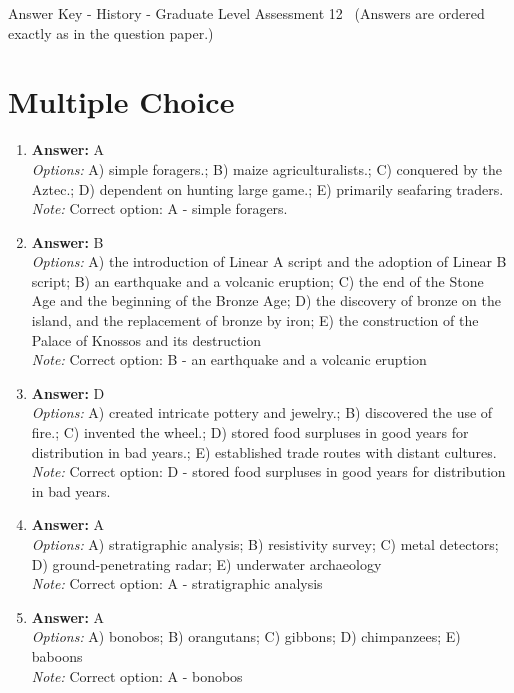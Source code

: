 \documentclass[12pt]{article}
\begin{document}
\begin{center}
Answer Key - History - Graduate Level Assessment 12 \
\small (Answers are ordered exactly as in the question paper.)
\end{center}

\section*{Multiple Choice}
\begin{enumerate}[label=\arabic*.]
\item \textbf{Answer:} A
\\ \textit{Options:} A) simple foragers.; B) maize agriculturalists.; C) conquered by the Aztec.; D) dependent on hunting large game.; E) primarily seafaring traders.
\\ \textit{Note:} Correct option: A - simple foragers.
\item \textbf{Answer:} B
\\ \textit{Options:} A) the introduction of Linear A script and the adoption of Linear B script; B) an earthquake and a volcanic eruption; C) the end of the Stone Age and the beginning of the Bronze Age; D) the discovery of bronze on the island, and the replacement of bronze by iron; E) the construction of the Palace of Knossos and its destruction
\\ \textit{Note:} Correct option: B - an earthquake and a volcanic eruption
\item \textbf{Answer:} D
\\ \textit{Options:} A) created intricate pottery and jewelry.; B) discovered the use of fire.; C) invented the wheel.; D) stored food surpluses in good years for distribution in bad years.; E) established trade routes with distant cultures.
\\ \textit{Note:} Correct option: D - stored food surpluses in good years for distribution in bad years.
\item \textbf{Answer:} A
\\ \textit{Options:} A) stratigraphic analysis; B) resistivity survey; C) metal detectors; D) ground-penetrating radar; E) underwater archaeology
\\ \textit{Note:} Correct option: A - stratigraphic analysis
\item \textbf{Answer:} A
\\ \textit{Options:} A) bonobos; B) orangutans; C) gibbons; D) chimpanzees; E) baboons
\\ \textit{Note:} Correct option: A - bonobos
\end{enumerate}
\end{document}
